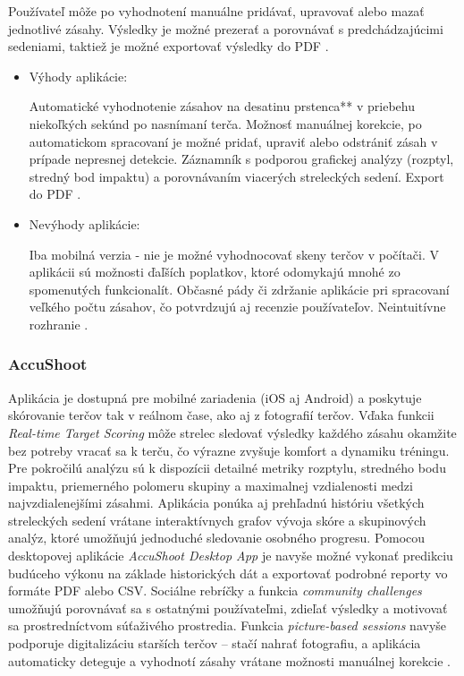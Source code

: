 Používateľ môže po vyhodnotení manuálne pridávať, upravovať alebo mazať jednotlivé zásahy. Výsledky je možné prezerať a porovnávať 
s predchádzajúcimi sedeniami, taktiež je možné exportovať výsledky do PDF \cite{BlackholeApp}.

\begin{itemize}
  \item Výhody aplikácie:

  Automatické vyhodnotenie zásahov na desatinu prstenca** v priebehu niekoľkých sekúnd po nasnímaní terča.
  Možnosť manuálnej korekcie, po automatickom spracovaní je možné pridať, upraviť alebo odstrániť zásah v prípade nepresnej detekcie.
  Záznamník s podporou grafickej analýzy (rozptyl, stredný bod impaktu) a porovnávaním viacerých streleckých sedení.
  Export do PDF \cite{BlackholeApp}.

  \item Nevýhody aplikácie:

  Iba mobilná verzia - nie je možné vyhodnocovať skeny terčov v počítači.
  V aplikácii sú možnosti ďaľších poplatkov, ktoré odomykajú mnohé zo spomenutých funkcionalít.
  Občasné pády či zdržanie aplikácie pri spracovaní veľkého počtu zásahov, čo potvrdzujú aj recenzie používateľov.
  Neintuitívne rozhranie \cite{BlackholeApp}.
\end{itemize}

\subsubsection{AccuShoot}
Aplikácia je dostupná pre mobilné zariadenia (iOS aj Android) a poskytuje skórovanie terčov tak v reálnom čase, ako aj z fotografií terčov. 
Vďaka funkcii \emph{Real-time Target Scoring} môže strelec sledovať výsledky každého zásahu okamžite bez potreby vracať sa k terču, 
čo výrazne zvyšuje komfort a dynamiku tréningu. Pre pokročilú analýzu sú k dispozícii detailné metriky rozptylu, stredného bodu impaktu, 
priemerného polomeru skupiny a maximalnej vzdialenosti medzi najvzdialenejšími zásahmi.  Aplikácia ponúka aj prehľadnú históriu všetkých 
streleckých sedení vrátane interaktívnych grafov vývoja skóre a skupinových analýz, ktoré umožňujú jednoduché sledovanie osobného progresu. 
Pomocou desktopovej aplikácie \emph{AccuShoot Desktop App} je navyše možné vykonať predikciu budúceho výkonu na základe historických dát a 
exportovať podrobné reporty vo formáte PDF alebo CSV. Sociálne rebríčky a funkcia \emph{community challenges} umožňujú porovnávať sa s ostatnými 
používateľmi, zdieľať výsledky a motivovať sa prostredníctvom súťaživého prostredia. Funkcia \emph{picture-based sessions} navyše podporuje 
digitalizáciu starších terčov – stačí nahrať fotografiu, a aplikácia automaticky deteguje a vyhodnotí zásahy vrátane možnosti manuálnej 
korekcie \cite{AccuShootApp}.

